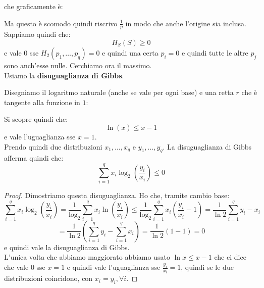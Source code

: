 \documentclass[a4paper,12pt, oneside]{book}
\begin{document}
che graficamente è:
\begin{figure}[H]
  \centering
\end{figure}
Ma questo è scomodo quindi riscrivo $\frac{1}{p}$ in modo che anche l'origine
sia inclusa. \\
Sappiamo quindi che:
\[H_S(S)\geq 0\]
e vale 0 sse $H_2(p_1,\ldots, p_q)=0$ e quindi una certa $p_i=0$ e quindi tutte
le altre $p_j$ sono anch'esse nulle.
Cerchiamo ora il massimo.\\
Usiamo la \textbf{disuguaglianza di Gibbs}.
\begin{teorema}
  Disegniamo il logaritmo naturale (anche se vale per ogni base) e
  una retta $r$ che è tangente alla funzione in $1$:
  \begin{figure}[H]
    \centering
  \end{figure}
  Si scopre quindi che:
  \[\ln (x)\leq x-1\]
  e vale l'uguaglianza sse $x=1$.\\
  Prendo quindi due distribuzioni $x_1,\ldots, x_q$ e $y_1,\ldots, y_q$. La
  disuguaglianza di Gibbs afferma quindi che:
  \[\sum_{i=1}^q x_i\log_2\left(\frac{y_i}{x_i}\right)\leq 0\]
\end{teorema}
\begin{proof}
  Dimostriamo questa disuguaglianza. Ho che, tramite cambio base:
  \[\sum_{i=1}^q
    x_i\log_2\left(\frac{y_i}{x_i}\right)=\frac{1}{\log_2}\sum_{i=1}^q
    x_i\ln\left(\frac{y_i}{x_i}\right)\leq \frac{1}{\log_2}\sum_{i=1}^q
    x_i\left(\frac{y_i}{x_i}-1\right)=\frac{1}{\ln 2}\sum_{i=1}^q y_i-x_i\]
  \[=\frac{1}{\ln 2}\left(\sum_{i=1}^q y_i-\sum_{i=1}^q x_i\right)=\frac{1}{\ln
      2}(1-1)=0\]
  e quindi vale la disuguaglianza di Gibbs.\\
  L'unica volta che abbiamo maggiorato abbiamo usato $\ln x\leq x-1$ che ci
  dice che vale $0$ sse  $x=1$ e quindi vale l'uguaglianza sse
  $\frac{y_i}{x_i}=1$, quindi se le due distribuzioni coincidono, con
  $x_i=y_i,\forall i$.
\end{proof}
\end{document}
